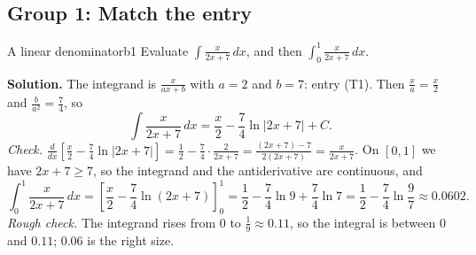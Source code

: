 \documentclass[11pt]{article}
\begin{document}
\subsection*{Group 1: Match the entry}

\begin{exmp}{A linear denominator}{b1}
Evaluate $\displaystyle\int\frac{x}{2x+7}\,dx$, and then $\displaystyle\int_0^1\frac{x}{2x+7}\,dx$.

\textbf{Solution.} The integrand is $\frac x{ax+b}$ with $a=2$ and $b=7$: entry (T1). Then $\frac xa=\frac x2$ and $\frac b{a^2}=\frac74$, so
\[\int\frac{x}{2x+7}\,dx=\frac x2-\frac74\ln\lvert2x+7\rvert+C .\]
\emph{Check.} $\frac d{dx}\left[\frac x2-\frac74\ln\lvert2x+7\rvert\right]=\frac12-\frac74\cdot\frac2{2x+7}=\frac{(2x+7)-7}{2(2x+7)}=\frac x{2x+7}$.
On $[0,1]$ we have $2x+7\ge7$, so the integrand and the antiderivative are continuous, and
\[\int_0^1\frac{x}{2x+7}\,dx=\left[\frac x2-\frac74\ln(2x+7)\right]_0^1=\frac12-\frac74\ln9+\frac74\ln7=\frac12-\frac74\ln\frac97\approx0.0602 .\]
\emph{Rough check.} The integrand rises from $0$ to $\frac19\approx0.11$, so the integral is between $0$ and $0.11$; $0.06$ is the right size.
\end{exmp}
\end{document}
